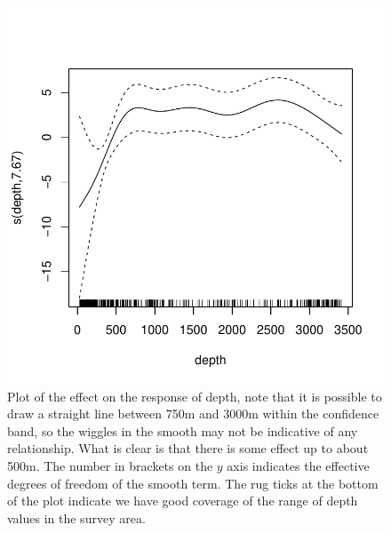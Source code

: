 \documentclass[a4paper,12pt]{article}
\begin{document}
\begin{figure}[h!]
  \caption{Plot of the effect on the response of depth, note that it is possible to draw a straight line between 750m and 3000m within the confidence band, so the wiggles in the smooth may not be indicative of any relationship. What is clear is that there is some effect up to about 500m. The number in brackets on the $y$ axis indicates the effective degrees of freedom of the smooth term. The rug ticks at the bottom of the plot indicate we have good coverage of the range of depth values in the survey area.}
  \label{depth-gamplot}
  \begin{center}
    \includegraphics[width=\textwidth]{figs/fit-depth-gam}
  \end{center}
\end{figure}

\newpage
\end{document}
